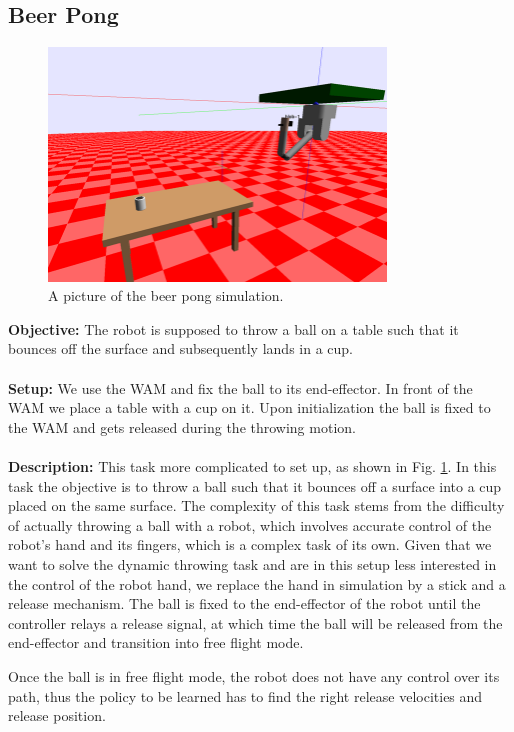 \documentclass[11pt, article, colorback]{article}
\begin{document}
\subsection{Beer Pong}
\begin{figure}
\centering
 \includegraphics[width=0.8\textwidth]{Pics/BeerPong.png}
  \caption{A picture of the beer pong simulation.}
  \label{pic:beerPong}
\end{figure}
%
\textbf{Objective:} The robot is supposed to throw a ball on a table such that it bounces off the surface
and subsequently lands in a cup. \\ \\
%
\textbf{Setup:}  We use the WAM and fix the ball to its end-effector. In front of the WAM we place a table 
with a cup on it. Upon initialization the ball is fixed to the WAM and gets released during the throwing motion. \\ \\
%
\textbf{Description:}
This task more complicated to set up, as shown in Fig. \ref{pic:beerPong}. In this task the objective is to throw a ball such that it bounces off a surface 
into a cup placed on the same surface. The complexity of this task stems from the difficulty of actually throwing 
a ball with a robot, which involves accurate control of the robot's hand and its fingers, which is a complex task 
of its own. Given that we want to solve the dynamic throwing task and are in this setup less interested in the control 
of the robot hand, we replace the hand in simulation by a stick and a release mechanism. The ball is fixed to the end-effector 
of the robot until the controller relays a release signal, at which time the ball will be released from the end-effector 
and transition into free flight mode. 

Once the ball is in free flight mode, the robot does not have any control over its path, thus the policy to be learned 
has to find the right release velocities and release position. 
\end{document}
